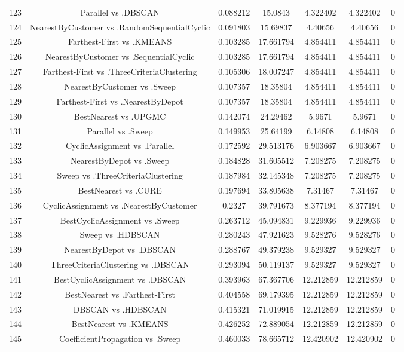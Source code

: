 \documentclass[a4paper,10pt]{article}
\begin{document}
\begin{landscape}
\begin{table}[!htp]
\begin{tabular}{ccccccc}
123&Parallel vs .DBSCAN&0.088212&15.0843&4.322402&4.322402&0\\
124&NearestByCustomer vs .RandomSequentialCyclic&0.091803&15.69837&4.40656&4.40656&0\\
125&Farthest-First vs .KMEANS&0.103285&17.661794&4.854411&4.854411&0\\
126&NearestByCustomer vs .SequentialCyclic&0.103285&17.661794&4.854411&4.854411&0\\
127&Farthest-First vs .ThreeCriteriaClustering&0.105306&18.007247&4.854411&4.854411&0\\
128&NearestByCustomer vs .Sweep&0.107357&18.35804&4.854411&4.854411&0\\
129&Farthest-First vs .NearestByDepot&0.107357&18.35804&4.854411&4.854411&0\\
130&BestNearest vs .UPGMC&0.142074&24.29462&5.9671&5.9671&0\\
131&Parallel vs .Sweep&0.149953&25.64199&6.14808&6.14808&0\\
132&CyclicAssignment vs .Parallel&0.172592&29.513176&6.903667&6.903667&0\\
133&NearestByDepot vs .Sweep&0.184828&31.605512&7.208275&7.208275&0\\
134&Sweep vs .ThreeCriteriaClustering&0.187984&32.145348&7.208275&7.208275&0\\
135&BestNearest vs .CURE&0.197694&33.805638&7.31467&7.31467&0\\
136&CyclicAssignment vs .NearestByCustomer&0.2327&39.791673&8.377194&8.377194&0\\
137&BestCyclicAssignment vs .Sweep&0.263712&45.094831&9.229936&9.229936&0\\
138&Sweep vs .HDBSCAN&0.280243&47.921623&9.528276&9.528276&0\\
139&NearestByDepot vs .DBSCAN&0.288767&49.379238&9.529327&9.529327&0\\
140&ThreeCriteriaClustering vs .DBSCAN&0.293094&50.119137&9.529327&9.529327&0\\
141&BestCyclicAssignment vs .DBSCAN&0.393963&67.367706&12.212859&12.212859&0\\
142&BestNearest vs .Farthest-First&0.404558&69.179395&12.212859&12.212859&0\\
143&DBSCAN vs .HDBSCAN&0.415321&71.019915&12.212859&12.212859&0\\
144&BestNearest vs .KMEANS&0.426252&72.889054&12.212859&12.212859&0\\
145&CoefficientPropagation vs .Sweep&0.460033&78.665712&12.420902&12.420902&0\\

\end{tabular}
\end{table}
\end{landscape}
\end{document}
